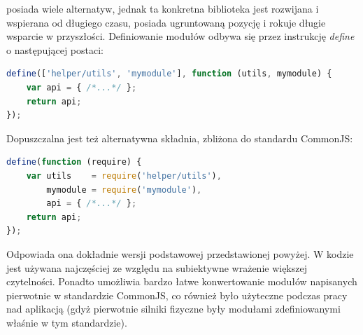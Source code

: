  posiada wiele alternatyw, jednak ta konkretna biblioteka jest
rozwijana i wspierana od długiego czasu, posiada ugruntowaną pozycję i rokuje
długie wsparcie w przyszłości. Definiowanie modułów odbywa się przez instrukcję
\emph{define} o następującej postaci:

\begin{lstlisting}[language=JavaScript, caption=Definicja modułu
przy użyciu technologii RequireJS]
define(['helper/utils', 'mymodule'], function (utils, mymodule) {
	var api = { /*...*/ };
	return api;
});
\end{lstlisting}

Dopuszczalna jest też alternatywna składnia, zbliżona do standardu CommonJS:

\begin{lstlisting}[language=JavaScript, caption=Alternatywna składnia definicji 
modułu przy użyciu technologii RequireJS]
define(function (require) {
	var utils 	 = require('helper/utils'),
		mymodule = require('mymodule'),
		api = { /*...*/ };
	return api;
});
\end{lstlisting}

Odpowiada ona dokładnie wersji podstawowej przedstawionej powyżej. W kodzie
\en jest używana najczęściej ze względu na subiektywne wrażenie większej
czytelności. Ponadto umożliwia bardzo łatwe konwertowanie modułów napisanych
pierwotnie w standardzie CommonJS, co również było użyteczne podczas pracy nad
aplikacją \en (gdyż pierwotnie silniki fizyczne były modułami zdefiniowanymi
właśnie w tym standardzie).
